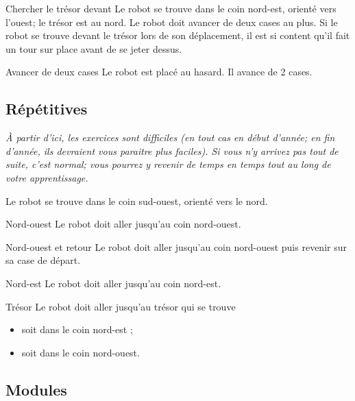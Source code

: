 \begin{Exercice}{Chercher le trésor devant}
	Le robot se trouve dans le coin nord-est, orienté vers
	l'ouest; le trésor est au nord. Le robot doit avancer
	de deux cases au plus. Si le robot se trouve devant le trésor lors de
	son déplacement, il est si content qu'il fait un tour
	sur place avant de se jeter dessus.
\end{Exercice}

\begin{Exercice}{Avancer de deux cases}
	Le robot est placé au hasard. Il avance de 2 cases.
\end{Exercice}


	\subsection{Répétitives}

		\emph{%
		À partir d'ici, les exercices sont difficiles
		(en tout cas en début d'année; en fin d'année,
		ils devraient vous paraitre plus faciles).
		Si vous n'y arrivez pas tout de suite, c'est normal; 
		vous pourrez y revenir de temps en temps 
		tout au long de votre apprentissage.
		}

		Le robot se trouve dans le coin sud-ouest, orienté vers le nord.

		\begin{Exercice}{Nord-ouest}
			Le robot doit aller jusqu'au coin nord-ouest.
		\end{Exercice}

		\begin{Exercice}{Nord-ouest et retour}
			Le robot doit aller jusqu'au coin nord-ouest
			puis revenir sur sa case de départ.
		\end{Exercice}

		\begin{Exercice}{Nord-est}
			Le robot doit aller jusqu'au coin nord-est.
		\end{Exercice}

		\begin{Exercice}{Trésor}
			Le robot doit aller jusqu'au trésor qui se trouve
			\begin{itemize}
			\item soit dans le coin nord-est ;
			\item soit dans le coin nord-ouest.
			\end{itemize}
		\end{Exercice}

	\subsection{Modules}

